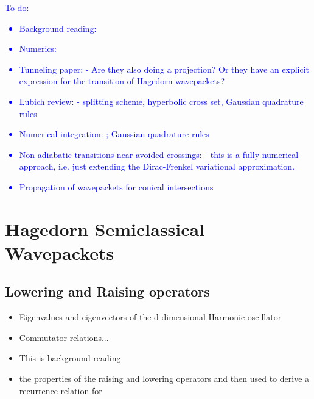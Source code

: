 \documentclass[12pt]{article}
\numberwithin{equation}{section}
\begin{document}
    
  \tableofcontents
  \newpage
\textcolor{blue}{To do:
\begin{itemize}
  \item Background reading: \cite{hagedornRaisingLoweringOperators1998}
  \item Numerics: \cite{faouComputingSemiclassicalQuantum2009} 
  \item Tunneling paper: \cite{gradinaruTunnelingDynamicsSpawning2010}
    - Are they also doing a projection? Or they have an explicit expression 
    for the transition of Hagedorn wavepackets?
  \item Lubich review: \cite{lubichQuantumClassicalMolecular2008} - splitting scheme, 
    hyperbolic cross set, Gaussian quadrature rules
  \item Numerical integration: \cite{bourquinNumericalAlgorithmsSemiclassical2017};
    Gaussian quadrature rules 
  \item Non-adiabatic transitions near avoided crossings: 
    \cite{bourquinNonadiabaticTransitionsAvoided2012} - this is a fully numerical 
    approach, i.e. just extending the Dirac-Frenkel variational 
    approximation. 
  \item Propagation of wavepackets for conical intersections \cite{fermanian-kammererPropagationWavePackets2020}
\end{itemize}}
\newpage
    \section{Hagedorn Semiclassical Wavepackets}
      
      \subsection{Lowering and Raising operators}
        \begin{itemize}
          \item Eigenvalues and eigenvectors of the d-dimensional 
        Harmonic oscillator
          \item Commutator relations...
          \item This is background reading 
          \item the properties of the raising and lowering operators 
            and then used to derive a recurrence relation for 
        \end{itemize}
\end{document}
